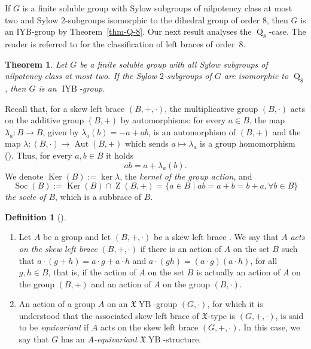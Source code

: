 \documentclass[12pt,a4paper]{article}
\newcommand\XX{\mathfrak{X}}
\DeclareMathOperator{\Soc}{Soc}
\DeclareMathOperator{\Z}{Z}
\DeclareMathOperator{\Ker}{Ker}
\DeclareMathOperator{\Aut}{Aut}
\DeclareMathOperator{\Q}{Q}
\DeclareMathOperator{\IYB}{IYB}
\DeclareMathOperator{\YB}{YB}
\newtheorem{athm}{Theorem}
\theoremstyle{definition}
\newtheorem{definition}[theorem]{Definition}
\begin{document}
If $G$ is a finite soluble group with Sylow subgroups of nilpotency class at most two and Sylow $2$-subgroups isomorphic to the dihedral group of order $8$, then $G$ is an IYB-group by Theorem~\ref{thm-Q-8}. Our next result analyses the $\Q_8$-case. The reader is referred to \cite[Theorem~3.1]{Bachiller2015-p3} for the classification of left braces of order~$8$.

\begin{athm}\label{thm-Sylow-Q-8}
Let $G$ be a finite soluble group with all Sylow subgroups of nilpotency class at most two. If the Sylow $2$-subgroups of $G$ are isomorphic to $\Q_8$, then $G$ is an $\IYB$-group.
\end{athm}


Recall that, for a skew left brace $(B,+,\cdot)$, the multiplicative group $(B,\cdot)$ acts on the additive group $(B,+)$ by automorphisms: for every $a\in B$, the map $\lambda_a \colon B \rightarrow B$, given by $\lambda_a(b) = -a + ab$, is an automorphism of $(B,+)$ and the map $\lambda\colon (B,\cdot) \rightarrow \Aut(B,+)$ which sends $a \mapsto \lambda_a$ is a group homomorphism (\cite{Rump2007}). Thus, for every $a,b\in B$ it holds
\begin{equation}
\label{eq:producte-lambda} a b = a+ \lambda_a(b).
\end{equation}
We denote $\Ker(B):= \ker \lambda $, the \emph{kernel of the group action}, and 
$$\Soc(B):=\Ker(B) \cap \Z(B,+)=\{a \in B \mid ab=a+b=b+a, \forall b \in B\}$$
\emph{the socle of $B$}, which is a subbrace of $B$.


\begin{definition}[{\cite[Definition~4]{BEJP2023}}]
\begin{enumerate}
\item Let $A$ be a group and let $(B,+,\cdot)$ be a skew left brace . We say that $A$ \emph{acts on the skew left brace} $(B,+,\cdot)$ if there is an action of $A$ on the set $B$ such that $a \cdot(g+h) = a\cdot g + a\cdot h$ and $a\cdot(gh) = (a\cdot g)(a\cdot h)$, for all $g, h \in B$, that is, if the action of $A$ on the set $B$ is actually an action of $A$ on the group $(B,+)$ and an action of $A$ on the group  $(B,\cdot)$.

\item An action of a group $A$ on an $\XX\YB$-group $(G, \cdot)$, for which it is understood that the associated skew left brace of $\XX$-type  is $(G, {+}, {\cdot})$, is said to be \emph{equivariant} if $A$ acts on the skew left brace $(G,+,\cdot)$. In this case, we say that $G$ has an \emph{$A$-equivariant} $\XX\YB$-structure.
\end{enumerate}
\end{definition}
\end{document}
